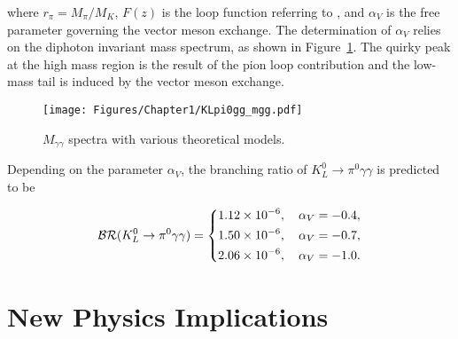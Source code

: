 \noindent
where $r_{\pi} = M_{\pi}/M_K$, $F(z)$ is the loop function referring to \parencite{ChPT_loop_func}, and $\alpha_V$ is the free parameter governing the vector meson exchange. The determination of $\alpha_V$ relies on the diphoton invariant mass spectrum, as shown in Figure~\ref{fig:kpi0gg_mgg}. The quirky peak at the high mass region is the result of the pion loop contribution and the low-mass tail is induced by the vector meson exchange. 
%

\begin{figure}[h]
\begin{center}
\captionsetup{width=.99\linewidth}
\texttt{[image: Figures/Chapter1/KLpi0gg\_mgg.pdf]}
\caption{$M_{\gamma\gamma}$ spectra with various theoretical models.}
\label{fig:kpi0gg_mgg}
\end{center}
\end{figure}

Depending on the parameter $\alpha_V$, the branching ratio of ${K_L^0\to\pi^0\gamma\gamma}$ is predicted to be~\parencite{KLpi0gg_ChPT_p6_VMD}
%

\begin{align*}
\mathcal{BR}(K_L^0 \to \pi^0 \gamma \gamma) =
\begin{dcases}
   1.12 \times 10^{-6}, \quad \alpha_V = -0.4 ,\\
   1.50 \times 10^{-6}, \quad \alpha_V = -0.7 ,\\
   2.06 \times 10^{-6}, \quad \alpha_V = -1.0 .
\end{dcases}
\end{align*}

\section{New Physics Implications}
\label{sec:bsm}

%
%


%

